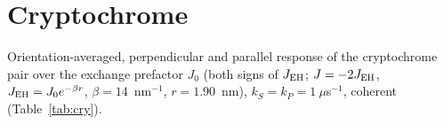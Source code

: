 \documentclass[11pt]{article}
\begin{document}
\begin{table}[h]
\caption{One-electron potentials in water.}
\label{tab:pot}
\centering

\end{table}

\begin{table}[h]
\caption{Raw DFT driving force of the contact pair.}
\label{tab:ddft}
\centering

\end{table}

\section{Cryptochrome}
Orientation-averaged, perpendicular and parallel response of the cryptochrome
pair over the exchange prefactor $J_0$ (both signs of $J_{\rm EH}$;
$J = -2J_{\rm EH}$, $J_{\rm EH} = J_0e^{-\beta r}$, $\beta = 14$~nm$^{-1}$,
$r = 1.90$~nm\cite{Efimova2008}), $k_S = k_P = 1~\mu$s$^{-1}$, coherent
(Table~\ref{tab:cry}).

\begin{table}[h]
\caption{Cryptochrome response (\%).}
\label{tab:cry}
\centering

\end{table}



\end{document}
